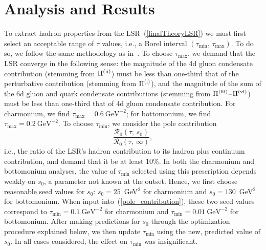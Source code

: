 \documentclass[11pt, letterpaper]{article}
\newcommand{\lsr}{\mathcal{R}_{0}}
\newcommand{\double}[2]{(#1,\,#2)}
\newcommand{\rom}[1]{\uppercase\expandafter{\romannumeral #1\relax}}
\begin{document}
\section{Analysis and Results}\label{IV}
To extract hadron properties from the LSR~(\ref{finalTheoryLSR})
we must first select an acceptable range of $\tau$ values, i.e., a Borel interval
$\double{\tau_{\text{min}}}{\tau_{\text{max}}}$.
To do so, we follow the same methodology 
as in~\cite{Chen:2013pya,ho:2017,BergHarnettKleivEtAl2012,Harnett:2012gs}.
To choose $\tau_{\text{max}}$, we demand that the LSR converge
in the following sense: the magnitude of the 
4d gluon condensate contribution (stemming from $\Pi^{\text{(\rom{2})}}$)
must be less than one-third that of the perturbative contribution
(stemming from $\Pi^{\text{(\rom{1})}}$), 
and the magnitude of the sum of the 
6d gluon and quark condensate contributions 
(stemming from $\Pi^{\text{(\rom{3})}}$--$\Pi^{\text{(\rom{6})}}$)
must be less than one-third
that of 4d gluon condensate contribution.
For charmonium, we find $\tau_{\text{max}}=0.6\ \text{GeV}^{-2}$;
for bottomonium, we find $\tau_{\text{max}}=0.2\ \text{GeV}^{-2}$.
To choose $\tau_{\text{min}}$, we consider the pole contribution
%
\begin{equation}\label{pole_contribution}
  \frac{\lsr\double{\tau}{s_0}}{\lsr\double{\tau}{\infty}},
\end{equation}
%
i.e., the ratio of the LSR's hadron contribution to its hadron plus continuum contribution, and demand that it be at least 10\%.
%
In both the charmonium and bottomonium analyses, 
the value of $\tau_{\text{min}}$ selected using this prescription
depends weakly on $s_0$, a parameter not known at the outset.
Hence, we first choose reasonable seed values for $s_0$:
$s_0=25$~GeV$^2$ for charmonium and $s_0=130$~GeV$^2$ for bottomonium.
When input into~(\ref{pole_contribution}), these two seed values correspond to 
$\tau_{\text{min}}=0.1\ \text{GeV}^{-2}$ for charmonium and
$\tau_{\text{min}}=0.01\ \text{GeV}^{-2}$ for bottomonium.
After making predictions for $s_0$ through the optimization procedure explained below, 
we then update $\tau_{\text{min}}$ using the new, predicted value of $s_0$.
In all cases considered, the effect on $\tau_{\text{min}}$ was insignificant.
\end{document}
